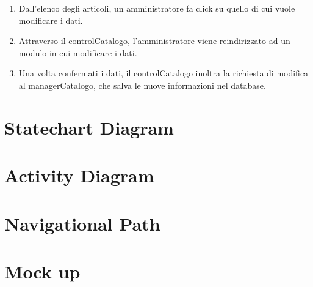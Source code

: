 \documentclass[12pt,a4paper]{article}
\begin{document}
\begin{enumerate}
\item Dall'elenco degli articoli, un amministratore fa click su quello di cui vuole modificare i dati.
\item Attraverso il controlCatalogo, l'amministratore viene reindirizzato ad un modulo in cui modificare i dati.
\item Una volta confermati i dati, il controlCatalogo inoltra la richiesta di modifica al managerCatalogo, che salva le nuove informazioni nel database.
\end{enumerate}

\section{Statechart Diagram}

\section{Activity Diagram}

\section{Navigational Path}

\section{Mock up}
\end{document}
